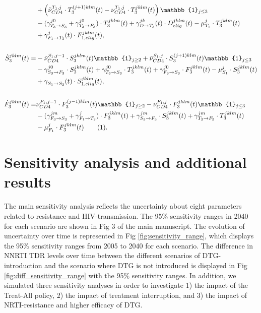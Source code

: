 \documentclass{article}
\newcommand\numberthis{\addtocounter{equation}{1}\tag{\theequation}}
\begin{document}
\begin{align*}
  &+\left(\tilde{\nu}_{CD4}^{T_1,j}\cdot T_3^{(j+1)klm}(t)-\nu_{CD4}^{T_1,j}\cdot T_3^{jklm}(t) \right)\mathbb{1}_{j\leq 3}\\
  &-(\gamma^{j0}_{T_3\rightarrow S_3}+\gamma^{j0}_{T_3\rightarrow F_3}
  )\cdot T_3^{jklm}(t)+\gamma^{jk}_{D\rightarrow T_3}(t)\cdot D_{elig}^{jklm}(t)-\mu_{T_1}^{j}\cdot T_3^{jklm}(t)\\
  &+\gamma_{F_1\rightarrow T_3}^{j}(t)\cdot F_{1,elig}^{jklm}(t),\\[16pt]
  \dot{S}_{3}^{jklm}(t) =& -\tilde{\nu}_{CD4}^{S_1,j-1}\cdot S_3^{jklm}(t)\mathbb{1}_{j\geq 2}+\tilde{\nu}_{CD4}^{S_1,j}\cdot S_3^{(j+1)klm}(t)\mathbb{1}_{j\leq 3}\\
  &-\gamma^{j0}_{S_3\rightarrow F_3} \cdot S_3^{jklm}(t)+\gamma^{j0}_{T_3\rightarrow S_3}\cdot T_3^{jklm}(t)+\gamma^{j0}_{F_3\rightarrow S_3}\cdot F_3^{jklm}(t)-\mu_{S_1}^{j}\cdot S_3^{jklm}(t)\\
  &+\gamma_{S_1\rightarrow S_3}^{}(t)\cdot S_{1,elig}^{jklm}(t),\\[16pt]
  \dot{F}_{3}^{jklm}(t) =&\nu_{CD4}^{F_1,j-1}\cdot F_3^{(j-1)klm}(t)\mathbb{1}_{j\geq 2}-\nu_{CD4}^{F_1,j}\cdot F_3^{jklm}(t)\mathbb{1}_{j\leq 3}\\
 &-(\gamma^{jm}_{F_3\rightarrow S_3}+\gamma^{j}_{F_1\rightarrow T_2})\cdot F_3^{jklm}(t)+\gamma^{jm}_{S_3\rightarrow F_3}\cdot S_3^{jklm}(t)+\gamma^{jm}_{T_3\rightarrow F_3}\cdot T_3^{jklm}(t)\\
 &-\mu_{F_1}^{j}\cdot F_3^{jklm}(t)\numberthis.
\end{align*}
\newpage
\section{Sensitivity analysis and additional results}\label{sec:sens}
The main sensitivity analysis reflects the uncertainty about eight parameters related to resistance and HIV-transmission. The 95\% sensitivity ranges in 2040 for each scenario are shown in Fig 3 of the main manuscript. The evolution of uncertainty over time is represented in Fig \ref{fig:sensitivity_range}, which displays the 95\% sensitivity ranges from 2005 to 2040 for each scenario. The difference in NNRTI TDR levels over time between the different scenarios of DTG-introduction and the scenario where DTG is not introduced is displayed in Fig \ref{fig:diff_sensitivity_range} with the 95\% sensitivity ranges. In addition, we simulated three sensitivity analyses in order to investigate 1) the impact of the Treat-All policy, 2) the impact of treatment interruption, and 3) the impact of NRTI-resistance and higher efficacy of DTG.
\end{document}
